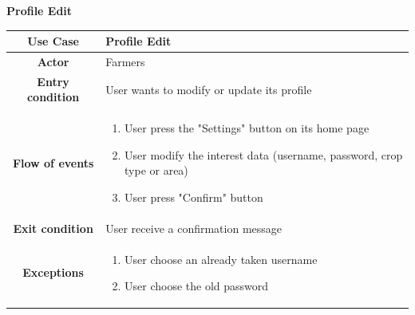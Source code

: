 \documentclass[table, 12pt]{article}
\begin{document}
\begin{itemize}
            \begin{table}[H]
                \item[] \textbf{Profile Edit}
                \item[] 
                \centering
                \begin{tabular}{|c |m{}|}
                    \hline
                    \textbf{Use Case} & Profile Edit\\ \hline
                    \textbf{Actor} & Farmers\\ \hline
                    \textbf{Entry condition} & User wants to modify or update its profile\\  \hline
                    \textbf{Flow of events} & \begin{enumerate}
                                                \item User press the "Settings" button on its home page
                                                \item User modify the interest data (username, password, crop type or area)
                                                \item User press "Confirm" button
                                            \end{enumerate}\\ \hline
                    \textbf{Exit condition} & User receive a confirmation message\\ \hline
                    \textbf{Exceptions} &  \begin{enumerate}
                        \item User choose an already taken username
                        \item User choose the old password
                    \end{enumerate}\\ \hline                    
                \end{tabular}
            \end{table}


\end{itemize}
\end{document}
